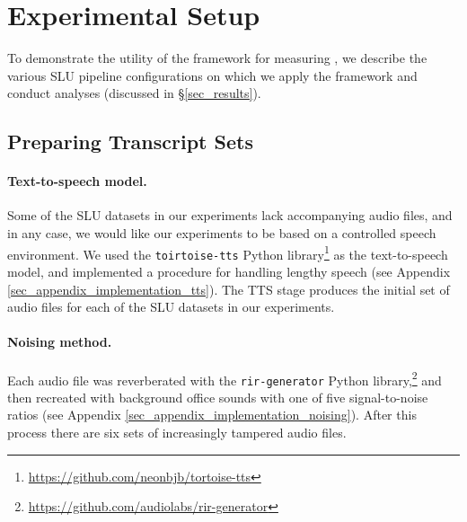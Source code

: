\section{Experimental Setup}
\label{sec_setup}




To demonstrate the utility of the framework for measuring \ENDow{}, we describe the various SLU pipeline configurations on which we apply the framework and conduct analyses (discussed in \S\ref{sec_results}).

\subsection{Preparing Transcript Sets}
\label{sec_setup_transcripts}

\paragraph{Text-to-speech model.}
Some of the SLU datasets in our experiments lack accompanying audio files, and in any case, we would like our experiments to be based on a controlled speech environment. We used the \texttt{toirtoise-tts} \citep{betker2023tortoisetts} Python library\footnote{\url{https://github.com/neonbjb/tortoise-tts}} as the text-to-speech model, and implemented a procedure for handling lengthy speech (see Appendix \ref{sec_appendix_implementation_tts}). The TTS stage produces the initial set of audio files for each of the SLU datasets in our experiments. 

\paragraph{Noising method.}
Each audio file was reverberated with the \texttt{rir-generator} \citep{werner2023rirgenerator} Python library,\footnote{\url{https://github.com/audiolabs/rir-generator}} and then recreated with background office sounds \citep[a clipped audio file;][]{myNoise2020office} with one of five signal-to-noise ratios (see Appendix \ref{sec_appendix_implementation_noising}). 
After this process there are six sets of increasingly tampered audio files.

